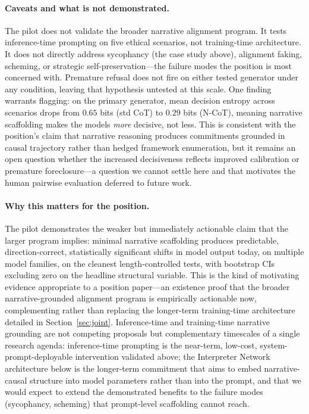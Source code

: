 \documentclass{article}
\theoremstyle{plain}
\theoremstyle{definition}
\theoremstyle{remark}
\begin{document}
\paragraph{Caveats and what is not demonstrated.} The pilot does not validate the broader narrative alignment program. It tests inference-time prompting on five ethical scenarios, not training-time architecture. It does not directly address sycophancy (the case study above), alignment faking, scheming, or strategic self-preservation---the failure modes the position is most concerned with. Premature refusal does not fire on either tested generator under any condition, leaving that hypothesis untested at this scale. One finding warrants flagging: on the primary generator, mean decision entropy across scenarios drops from $0.65$ bits (std CoT) to $0.29$ bits (N-CoT), meaning narrative scaffolding makes the models \emph{more} decisive, not less. This is consistent with the position's claim that narrative reasoning produces commitments grounded in causal trajectory rather than hedged framework enumeration, but it remains an open question whether the increased decisiveness reflects improved calibration or premature foreclosure---a question we cannot settle here and that motivates the human pairwise evaluation deferred to future work.

\paragraph{Why this matters for the position.} The pilot demonstrates the weaker but immediately actionable claim that the larger program implies: minimal narrative scaffolding produces predictable, direction-correct, statistically significant shifts in model output today, on multiple model families, on the cleanest length-controlled tests, with bootstrap CIs excluding zero on the headline structural variable. This is the kind of motivating evidence appropriate to a position paper---an existence proof that the broader narrative-grounded alignment program is empirically actionable now, complementing rather than replacing the longer-term training-time architecture detailed in Section~\ref{sec:joint}. Inference-time and training-time narrative grounding are not competing proposals but complementary timescales of a single research agenda: inference-time prompting is the near-term, low-cost, system-prompt-deployable intervention validated above; the Interpreter Network architecture below is the longer-term commitment that aims to embed narrative-causal structure into model parameters rather than into the prompt, and that we would expect to extend the demonstrated benefits to the failure modes (sycophancy, scheming) that prompt-level scaffolding cannot reach.
\end{document}

